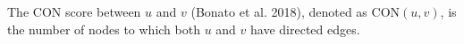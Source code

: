 \documentclass[preview]{standalone}
\begin{document}
The CON score between $u$ and $v$ (Bonato et al. 2018), denoted as $\text{CON}(u, v)$, is the number of nodes to which both $u$ and $v$ have directed edges.\\
\end{document}
